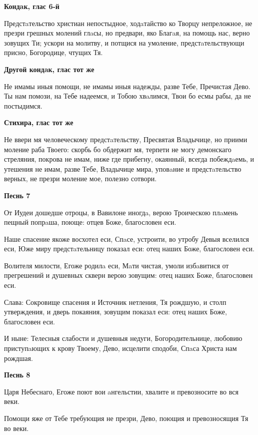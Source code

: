 \medskip
\bfseries Кондaк, глас 6-й\normalfont{}\nopagebreak


Предстaтельство христиан непостыдное, ходaтайство ко Творцу непреложное, не презри грешных молений глaсы, но предвари, яко Благaя, на помощь нас, верно зовущих Ти; ускори на молитву, и потщися на умоление, предстaтельствующи присно, Богородице, чтущих Тя.


\medskip
\bfseries Другой кондaк, глас тот же\normalfont{}\nopagebreak





 Не имамы иныя помощи, не имамы иныя надежды, разве Тебе, Пречистая Дево. Ты нам помози, на Тебе надеемся, и Тобою хвaлимся, Твои бо есмы рабы, да не постыдимся.


\medskip
\bfseries Стихира, глас тот же\normalfont{}\nopagebreak

Не ввери мя человеческому предстaтельству, Пресвятая Владычице, но приими моление раба Твоего: скорбь бо обдержит мя, терпети не могу демонскаго стреляния, покрова не имам, ниже где прибегну, окаянный, всегда побеждaемь, и утешения не имам, разве Тебе, Владычице мира, уповaние и предстaтельство верных, не презри моление мое, полезно сотвори.


\medskip
\bfseries Песнь 7\normalfont{}\nopagebreak


От Иудеи дошедше отроцы, в Вавилоне иногдa, верою Троическою плaмень пещный попрaша, поюще: отцев Боже, благословен еси.


Наше спасение якоже восхотел еси, Спaсе, устроити, во утробу Девыя вселился еси, Юже миру предстaтельницу показал еси: отец наших Боже, благословен еси.


Волителя милости, Егоже родилa еси, Мaти чистая, умоли избaвитися от прегрешений и душевных скверн верою зовущим: отец наших Боже, благословен еси.


Слава: Сокровище спасения и Источник нетления, Тя рождшую, и столп утверждения, и дверь покаяния, зовущим показал еси: отец наших Боже, благословен еси.


И ныне: Телесныя слабости и душевныя недуги, Богородительнице, любовию приступaющих к крову Твоему, Дево, исцелити сподоби, Спaса Христа нам рождшая.


\medskip
\bfseries Песнь 8\normalfont{}\nopagebreak

Царя Небеснаго, Егоже поют вои aнгельстии, хвалите и превозносите во вся веки.

Помощи яже от Тебе требующия не презри, Дево, поющия и превозносящия Тя во веки.

